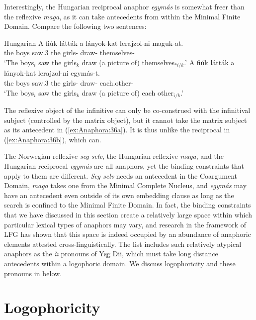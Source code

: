 \documentclass[output=paper,hidelinks]{langscibook}
\begin{document}
Interestingly, the Hungarian reciprocal anaphor \emph{egymás} is somewhat freer than the reflexive \emph{maga}, as it can take antecedents from within the Minimal Finite Domain. Compare the following two sentences:

\newpage
\ea\label{ex:Anaphora:36} Hungarian \citep[153]{LaczkoRakosi2019}
\ea\label{ex:Anaphora:36a}\gll
A    fiúk    látták   a     lányok-kat  lerajzol-ni    maguk-at.\\
 the boys  saw.{3\PL} the  girls-{\ACC}  draw-{\INF}   themselves-{\ACC}\\
 \glt`The boys$_i$ saw the girls$_k$        draw (a picture of) themselves$_{*i/k}$.'
\ex\label{ex:Anaphora:36b}\gll
 A    fiúk    látták   a     lányok-kat   lerajzol-ni    egymás-t. \\
 the boys  saw.{3\PL} the  girls-{\ACC}  draw-{\INF}   each.other-{\ACC}\\
 \glt`The boys$_i$ saw the girls$_k$        draw (a picture of) each other$_{i/k}$.'
\z\z

\noindent The reflexive object of the infinitive can only be co-construed with the infinitival subject (controlled by the matrix object), but it cannot take the matrix subject as its antecedent in (\ref{ex:Anaphora:36a}). It is thus unlike the reciprocal in (\ref{ex:Anaphora:36b}), which can.

The Norwegian reflexive \emph{seg selv}, the Hungarian reflexive \emph{maga}, and the Hungarian reciprocal \emph{egymás} are all anaphors, yet the binding constraints that apply to them are different. \emph{Seg selv} needs an antecedent in the Coargument Domain, \emph{maga} takes one from the Minimal Complete Nucleus, and \emph{egymás} may have an antecedent even outside of its own embedding clause as long as the search is confined to the Minimal Finite Domain. In fact, the binding constraints that we have discussed in this section create a relatively large space within which particular lexical types of anaphors may vary, and research in the framework of LFG has shown that this space is indeed occupied by an abundance of anaphoric elements attested cross-linguistically. The list includes such relatively atypical anaphors as the \emph{ìı} pronouns of Y\c{a}g Dii, which must take long distance antecedents \citep{Dalrymple2015} within a logophoric domain. We discuss logophoricity and these pronouns in  below.

\section{Logophoricity}
\label{sec:Anaphora:4}
\end{document}
